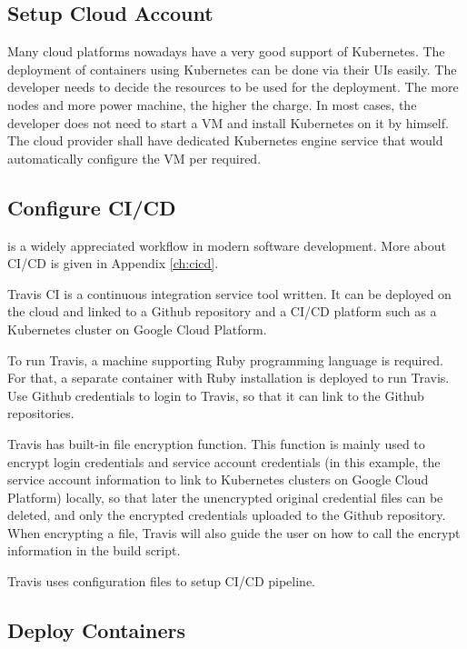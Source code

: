 \subsection{Setup Cloud Account}

Many cloud platforms nowadays have a very good support of Kubernetes. The deployment of containers using Kubernetes can be done via their UIs easily. The developer needs to decide the resources to be used for the deployment. The more nodes and more power machine, the higher the charge. In most cases, the developer does not need to start a VM and install Kubernetes on it by himself. The cloud provider shall have dedicated Kubernetes engine service that would automatically configure the VM per required.

\subsection{Configure CI/CD}

 is a widely appreciated workflow in modern software development. More about CI/CD is given in Appendix \ref{ch:cicd}.

Travis CI is a continuous integration service tool written. It can be deployed on the cloud and linked to a Github repository and a CI/CD platform such as a Kubernetes cluster on Google Cloud Platform.

To run Travis, a machine supporting Ruby programming language is required. For that, a separate container with Ruby installation is deployed to run Travis. Use Github credentials to login to Travis, so that it can link to the Github repositories.

Travis has built-in file encryption function. This function is mainly used to encrypt login credentials and service account credentials (in this example, the service account information to link to Kubernetes clusters on Google Cloud Platform) locally, so that later the unencrypted original credential files can be deleted, and only the encrypted credentials uploaded to the Github repository. When encrypting a file, Travis will also guide the user on how to call the encrypt information in the build script.

Travis uses configuration files to setup CI/CD pipeline.

\subsection{Deploy Containers}

